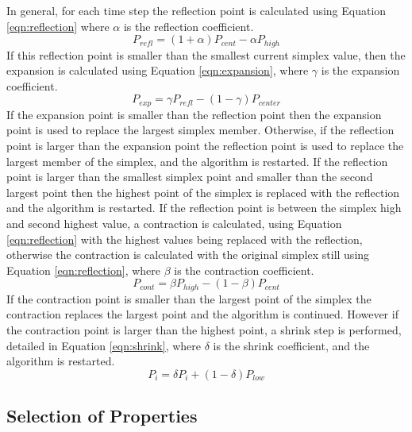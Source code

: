 \documentclass[pdflatex,sn-mathphys]{sn-jnl}
\begin{document}
	In general, for each time step the reflection point is calculated using Equation \ref{eqn:reflection} where $\alpha$ is the reflection coefficient.
		\begin{equation}\label{eqn:reflection}
			P_{refl} = (1 + \alpha) P_{cent} - \alpha P_{high}
		\end{equation}
	If this reflection point is smaller than the smallest current simplex value, then the expansion is calculated using Equation \ref{eqn:expansion}, where $\gamma$ is the expansion coefficient.
		\begin{equation}\label{eqn:expansion}
			P_{exp} = \gamma P_{refl} - (1 - \gamma) P_{center}
		\end{equation}
	If the expansion point is smaller than the reflection point then the expansion point is used to replace the largest simplex member.  Otherwise, if the reflection point is larger than the expansion point the reflection point is used to replace the largest member of the simplex, and the algorithm is restarted.
	If the reflection point is larger than the smallest simplex point and smaller than the second largest point then the highest point of the simplex is replaced with the reflection and the algorithm is restarted. 
	If the reflection point is between the simplex high and second highest value, a contraction is calculated, using Equation \ref{eqn:reflection} with the highest values being replaced with the reflection, otherwise the contraction is calculated with the original simplex still using Equation \ref{eqn:reflection}, where $\beta$ is the contraction coefficient.
		\begin{equation}\label{eqn:contraction}
			P_{cont} = \beta P_{high} - (1 - \beta) P_{cent}	
		\end{equation}
	If the contraction point is smaller than the largest point of the simplex the contraction replaces the largest point and the algorithm is continued.
	However if the contraction point is larger than the highest point, a shrink step is performed, detailed in Equation \ref{eqn:shrink}, where $\delta$ is the shrink coefficient, and the algorithm is restarted.
		\begin{equation}\label{eqn:shrink}
			P_{i} = \delta P_{i} + (1 - \delta) P_{low}
		\end{equation}


	\subsection{Selection of Properties} \label{sensetivity_results}
\end{document}
